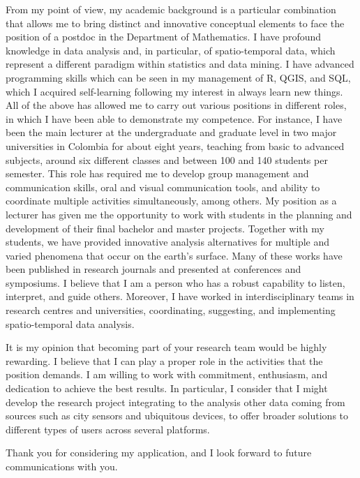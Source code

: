 \documentclass[11pt, a4paper]{awesome-cv}
\begin{document}
\begin{cvletter}
From my point of view, my academic background is a particular combination that allows me to bring distinct and innovative conceptual elements to face the position of a postdoc in the Department of Mathematics. I have profound knowledge in data analysis and, in particular, of spatio-temporal data, which represent a different paradigm within statistics and data mining. I have advanced programming skills which can be seen in my management of R, QGIS, and SQL, which I acquired self-learning following my interest in always learn new things. All of the above has allowed me to carry out various positions in different roles, in which I have been able to demonstrate my competence. For instance, I have been the main lecturer at the undergraduate and graduate level in two major universities in Colombia for about eight years, teaching from basic to advanced subjects, around six different classes and between 100 and 140 students per semester. This role has required me to develop group management and communication skills, oral and visual communication tools, and ability to coordinate multiple activities simultaneously, among others. My position as a lecturer has given me the opportunity to work with students in the planning and development of their final bachelor and master projects. Together with my students, we have provided innovative analysis alternatives for multiple and varied phenomena that occur on the earth's surface. Many of these works have been published in research journals and presented at conferences and symposiums. I believe that I am a person who has a robust capability to listen, interpret, and guide others. Moreover, I have worked in interdisciplinary teams in research centres and universities, coordinating, suggesting, and implementing spatio-temporal data analysis. \par
It is my opinion that becoming part of your research team would be highly rewarding. I believe that I can play a proper role in the activities that the position demands. I am willing to work with commitment, enthusiasm, and dedication to achieve the best results. In particular, I consider that I might develop the research project integrating to the analysis other data coming from sources such as city sensors and ubiquitous devices, to offer broader solutions to different types of users across several platforms.\par\bigskip
Thank you for considering my application, and I look forward to future communications with you.
\end{cvletter}


\makeletterclosing
\end{document}
